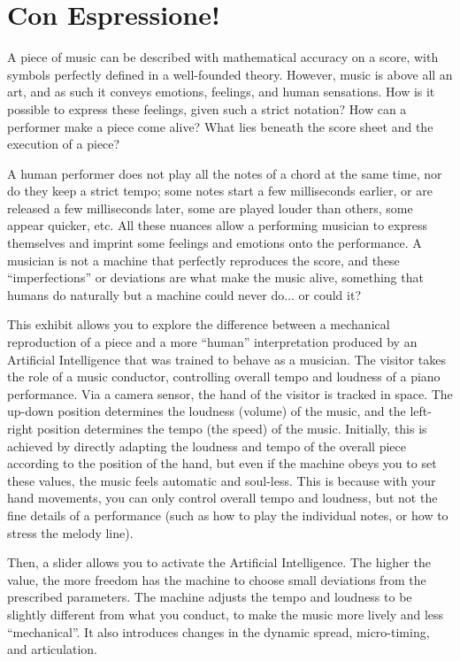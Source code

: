 \section{Con Espressione!}
A piece of music can be described with mathematical accuracy on a score, with symbols perfectly defined in a well-founded theory. However, music is above all an art, and as such it conveys emotions, feelings, and human sensations. How is it possible to express these feelings, given such a strict notation? How can a performer make a piece come alive? What lies beneath the score sheet and the execution of a piece?
 
A human performer does not play all the notes of a chord at the same time, nor do they keep a strict tempo; some notes start a few milliseconds earlier, or are released a few milliseconds later, some are played louder than others, some appear quicker, etc. All these nuances allow a performing musician to express themselves and imprint some feelings and emotions onto the performance. A musician is not a machine that perfectly reproduces the score, and these ``imperfections'' or deviations are what make the music alive, something that humans do naturally but a machine could never do... or could it?	

This exhibit allows you to explore the difference between a mechanical reproduction of a piece and a more ``human'' interpretation produced by an Artificial Intelligence that was trained to behave as a musician. The visitor takes the role of a music conductor, controlling overall tempo and loudness of a piano performance. Via a camera sensor, the hand of the visitor is tracked in space. The up-down position determines the loudness (volume) of the music, and the left-right position determines the tempo (the speed) of the music. Initially, this is achieved by directly adapting the loudness and tempo of the overall piece according to the position of the hand, but even if the machine obeys you to set these values, the music feels automatic and soul-less. This is because with your hand movements, you can only control overall tempo and loudness, but not the fine details of a performance (such as how to play the individual notes, or how to stress the melody line).

Then, a slider allows you to activate the Artificial Intelligence. The higher the value, the more freedom has the machine to choose small deviations from the prescribed parameters. The machine adjusts the tempo and loudness to be slightly different from what you conduct, to make the music more lively and less ``mechanical''. It also introduces changes in the dynamic spread, micro-timing, and articulation.

